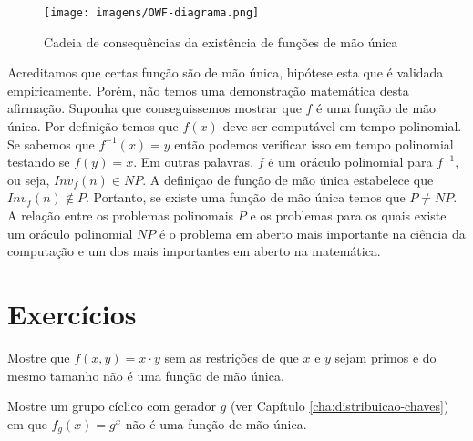 \begin{figure}[htbp]
  \centering
    \texttt{[image: imagens/OWF-diagrama.png]}
  \caption{Cadeia de consequências da existência de funções de mão única}
  \label{fig:owf-seguranca}
\end{figure}

Acreditamos que certas função são de mão única, hipótese esta que é validada empiricamente.
Porém, não temos uma demonstração matemática desta afirmação.
Suponha que conseguissemos mostrar que $f$ é uma função de mão única.
Por definição temos que $f(x)$ deve ser computável em tempo polinomial.
Se sabemos que $f^{-1}(x) = y$ então podemos verificar isso em tempo polinomial testando se $f(y) = x$.
Em outras palavras, $f$ é um oráculo polinomial para $f^{-1}$, ou seja, $Inv_f(n) \in NP$.
A definiçao de função de mão única estabelece que $Inv_f(n) \notin P$.
Portanto, se existe uma função de mão única temos que $P \neq NP$.
A relação entre os problemas polinomais $P$ e os problemas para os quais existe um oráculo polinomial $NP$ é o problema em aberto mais importante na ciência da computação e um dos mais importantes em aberto na matemática.

\section{Exercícios}
\label{sec:exercicios}

\begin{exercicio}
  Mostre que $f(x,y) = x \cdot y$ sem as restrições de que $x$ e $y$ sejam primos e do mesmo tamanho não é uma função de mão única.
\end{exercicio}


\begin{exercicio}
  Mostre um grupo cíclico com gerador $g$ (ver Capítulo \ref{cha:distribuicao-chaves}) em que $f_g(x) = g^x$ não é uma função de mão única.
\end{exercicio}
